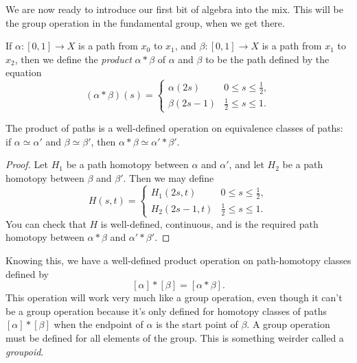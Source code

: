 \documentclass[noname]{notes}
\begin{document}
We are now ready to introduce our first bit of algebra into the mix. This will be the group operation in the fundamental group, when we get there.  

\begin{definition}
	If $\alpha \colon [0,1] \to X$ is a path from $x_0$ to $x_1$, and $\beta \colon [0,1] \to X$ is a path from $x_1$ to $x_2$, then we define the \textit{product} $\alpha \ast \beta$ of $\alpha$ and $\beta$ to be the path defined by the equation 
	\[
		(\alpha \ast \beta)(s) = 
		\begin{cases}
			\alpha(2s) & 0 \leq s \leq \frac 1 2, \\
			\beta(2s-1) & \frac 1 2 \leq s \leq 1. 
		\end{cases}
	\]
\end{definition}

\begin{lemma}
	The product of paths is a well-defined operation on equivalence classes of paths: if $\alpha \simeq \alpha'$ and $\beta \simeq \beta'$, then $\alpha * \beta \simeq \alpha' * \beta'$. 
\end{lemma}

\begin{proof}
	Let $H_1$ be a path homotopy between $\alpha$ and $\alpha'$, and let $H_2$ be a path homotopy between $\beta$ and $\beta'$. Then we may define 
	\[
		H(s,t) = 
		\begin{cases}
			H_1(2s,t) & 0 \leq s \leq \frac 1 2, \\
			H_2(2s-1,t) & \frac 1 2 \leq s \leq 1. 
		\end{cases}
	\]
	You can check that $H$ is well-defined, continuous, and is the required path homotopy between $\alpha * \beta$ and $\alpha' * \beta'$. 
\end{proof}

Knowing this, we have a well-defined product operation on path-homotopy classes defined by  
\[
	[\alpha] * [\beta] = [\alpha * \beta].
\]
This operation will work very much like a group operation, even though it can't be a group operation because it's only defined for homotopy classes of paths $[\alpha] * [\beta]$ when the endpoint of $\alpha$ is the start point of $\beta$. A group operation must be defined for all elements of the group. This is something weirder called a \textit{groupoid}. 
\end{document}
